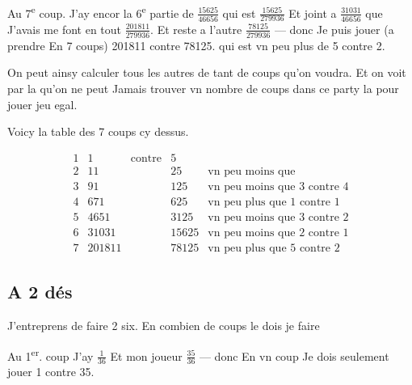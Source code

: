 \documentclass[11pt,a4paper]{article}
\begin{document}
Au 7\textsuperscript{e} coup. J'ay encor la 6\textsuperscript{e} partie de $\frac{15625}{46656}$ qui est $\frac{15625}{279936}$ Et joint a $\frac{31031}{46656}$ que J'avais me font en tout $\frac{201811}{279936}$. Et reste a l'autre $\frac{78125}{279936}$ — donc Je puis jouer (a prendre En 7 coups) 201811 contre 78125. qui est vn peu plus de 5 contre 2.

On peut ainsy calculer tous les autres de tant de coups qu'on voudra. Et on voit par la qu'on ne peut Jamais trouver vn nombre de coups dans ce party la pour jouer jeu egal.

Voicy la table des 7 \struck{\ill{}} coups cy dessus.

\[
\begin{array}{rrcrl}
1 & 1 & \text{contre} & 5 & \\
2 & 11 & & 25 & \text{vn peu moins que} \\
3 & 91 & & 125 & \text{vn peu moins que 3 contre 4} \\
4 & 671 & & 625 & \text{vn peu plus que 1 contre 1} \\
5 & 4651 & & 3125 & \text{vn peu moins que 3 contre 2} \\
6 & 31031 & & 15625 & \text{vn peu moins que 2 contre 1} \\
7 & 201811 & & 78125 & \text{vn peu plus que 5 contre 2}
\end{array}
\]

\subsection*{A 2 dés}

J'entreprens de faire 2 six. En combien de coups le dois je faire

Au 1\textsuperscript{er}. coup J'ay $\frac{1}{36}$ Et mon joueur $\frac{35}{36}$ — donc En vn coup Je dois seulement jouer 1 contre 35.
\end{document}
